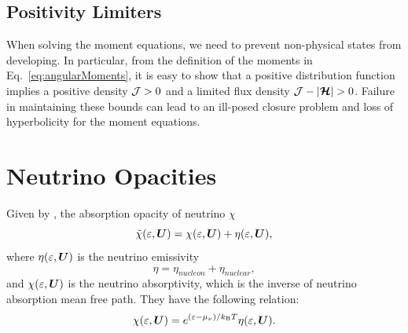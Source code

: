 \documentclass[10pt,preprint]{aastex}
\newcommand{\ee}[1]{{\color{red} #1}}
\begin{document}
\subsection{Positivity Limiters}
\label{sec:positivityLimiters}

When solving the moment equations, we need to prevent non-physical states from developing.  
In particular, from the definition of the moments in Eq.~\eqref{eq:angularMoments}, it is easy to show that a positive distribution function implies a positive density $\mathcal{J}>0$ and a limited flux density $\cJ-|\bcH|>0$.  
Failure in maintaining these bounds can lead to an ill-posed closure problem and loss of hyperbolicity for the moment equations.  

\section{Neutrino Opacities}


Given by \citet{bruenn_1985}, the absorption opacity of neutrino $\chi$ 
\begin{equation}
  \tilde{\chi}(\varepsilon,\boldsymbol{U}) = \chi(\varepsilon,\boldsymbol{U}) + \eta(\varepsilon,\boldsymbol{U}), 
\end{equation}
where $\eta(\varepsilon,\boldsymbol{U}) $ is the neutrino emissivity
\begin{equation}
\eta = \eta_{nucleon} + \eta_{nuclear},
\end{equation}  
and $ \chi(\varepsilon,\boldsymbol{U})$ is the neutrino absorptivity, which is the inverse of neutrino absorption mean free path.
They have the following relation:
\begin{equation}
\chi(\varepsilon,\boldsymbol{U}) = e^{(\varepsilon-\mu_{\nu})/k_{\mbox{\tiny B}}T} \eta(\varepsilon,\boldsymbol{U}). 
\end{equation}
\end{document}

